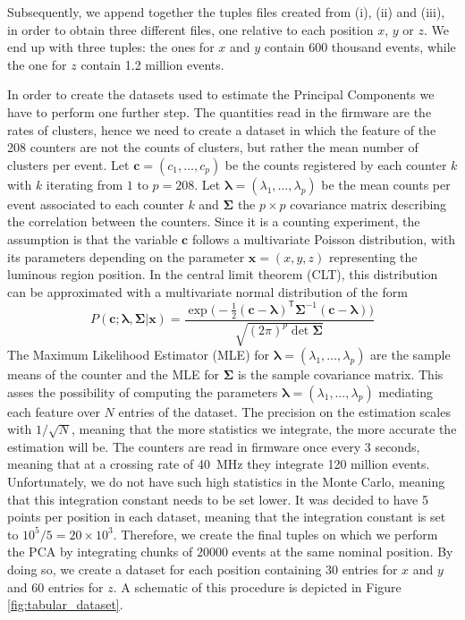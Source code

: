 Subsequently, we append together the tuples files created from (i), (ii) and (iii), in order to obtain three different files, one relative to each position $x$, $y$ or $z$. We end up with three tuples: the ones for $x$ and $y$ contain 600 thousand events, while the one for $z$ contain 1.2 million events. 

In order to create the datasets used to estimate the Principal Components we have to perform one further step.
The quantities read in the firmware are the rates of clusters, hence we need to create a dataset in which the feature of the 208 counters are not the counts of clusters, but rather the mean number of clusters per event. 
Let $\mathbf{c}=(c_1, \dots, c_p)$ be the counts registered by each counter $k$ with $k$ iterating from $1$ to $p=208$. Let $\mathbf{\lambda}=(\lambda_1, \dots, \lambda_p)$ be the mean counts per event associated to each counter $k$ and $\mathbf{\Sigma}$ the $p\times p$ covariance matrix describing the correlation between the counters. Since it is a counting experiment, the assumption is that the variable $\mathbf{c}$ follows a multivariate Poisson distribution, with its parameters depending on the parameter $\mathbf{x}=(x,y,z)$ representing the luminous region position. In the central limit theorem (CLT), this distribution can be approximated with a multivariate normal distribution of the form 
\begin{equation}
    P(\mathbf{c} ; \mathbf{\lambda},\mathbf{\Sigma} |\mathbf{x}) = \frac{\exp \bigl(-\frac{1}{2}(\mathbf{c}-\mathbf{\lambda})^{\mathsf{T}}\mathbf{\Sigma}^{-1}(\mathbf{c}-\mathbf{\lambda})\bigr)}{\sqrt{(2\pi)^p\det\mathbf{\Sigma}}}\label{mvgaussian}
\end{equation} 
The Maximum Likelihood Estimator (MLE) for  $\mathbf{\lambda}=(\lambda_1, \dots, \lambda_p)$ are the sample means of the counter and the MLE for $\mathbf{\Sigma}$ is the sample covariance matrix.
This asses the possibility of computing the parameters  $\mathbf{\lambda}=(\lambda_1, \dots, \lambda_p)$ mediating each feature over $N$ entries of the dataset. The precision on the estimation scales with $1/\sqrt{N}$, meaning that the more statistics we integrate, the more accurate the estimation will be. 
The counters are read in firmware once every $3$ seconds, meaning that at a crossing rate of \SI{40}{\mega\hertz} they integrate 120 million events. Unfortunately, we do not have such high statistics in the Monte Carlo, meaning that this integration constant needs to be set lower. It was decided to have 5 points per position in each dataset, meaning that the integration constant is set to $10^5/5=20\times10^3$. Therefore, we create the final tuples on which we perform the PCA by integrating chunks of $20000$ events at the same nominal position. By doing so, we create a dataset for each position containing 30 entries for $x$ and $y$ and 60 entries for $z$. A schematic of this procedure is depicted in Figure \ref{fig:tabular_dataset}. 

